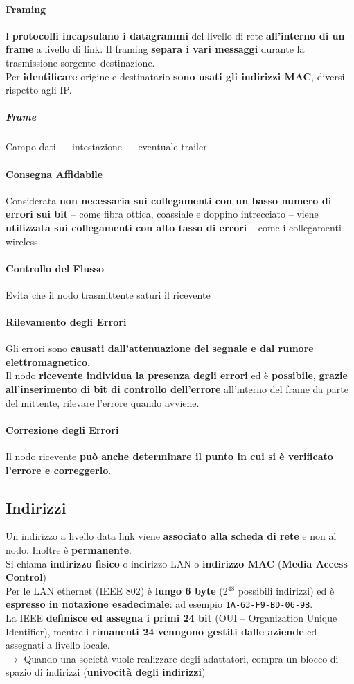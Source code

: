 \documentclass[10pt]{article}
\begin{document}
\paragraph{Framing} I \textbf{protocolli incapsulano i datagrammi} del livello di rete \textbf{all'interno di un frame} a livello di link. Il framing \textbf{separa i vari messaggi} durante la trasmissione sorgente--destinazione.\\
Per \textbf{identificare} origine e destinatario \textbf{sono usati gli indirizzi MAC}, diversi rispetto agli IP.
\subparagraph{Frame} Campo dati --- intestazione --- eventuale trailer
\paragraph{Consegna Affidabile} Considerata \textbf{non necessaria sui collegamenti con un basso numero di errori sui bit} -- come fibra ottica, coassiale e doppino intrecciato -- viene \textbf{utilizzata sui collegamenti con alto tasso di errori} -- come i collegamenti wireless.
\paragraph{Controllo del Flusso} Evita che il nodo trasmittente saturi il ricevente
\paragraph{Rilevamento degli Errori} Gli errori sono \textbf{causati dall'attenuazione del segnale e dal rumore elettromagnetico}.\\
Il nodo \textbf{ricevente individua la presenza degli errori} ed è \textbf{possibile}, \textbf{grazie all'inserimento di bit di controllo dell'errore} all'interno del frame da parte del mittente, rilevare l'errore quando avviene.
\paragraph{Correzione degli Errori} Il nodo ricevente \textbf{può anche determinare il punto in cui si è verificato l'errore e correggerlo}.
\subsection{Indirizzi}
Un indirizzo a livello data link viene \textbf{associato alla scheda di rete} e non al nodo. Inoltre è \textbf{permanente}.\\
Si chiama \textbf{indirizzo fisico} o indirizzo LAN o \textbf{indirizzo MAC} (\textbf{Media Access Control})\\
	Per le LAN ethernet (IEEE 802) è \textbf{lungo 6 byte} (2$^{48}$ possibili indirizzi) ed è \textbf{espresso in notazione esadecimale}: ad esempio \texttt{1A-63-F9-BD-06-9B}.\\
	La IEEE \textbf{definisce ed assegna i primi 24 bit} (OUI -- Organization Unique Identifier), mentre i \textbf{rimanenti 24 venngono gestiti dalle aziende} ed assegnati a livello locale.\\
	$\rightarrow$ Quando una società vuole realizzare degli adattatori, compra un blocco di spazio di indirizzi (\textbf{univocità degli indirizzi})
\end{document}
